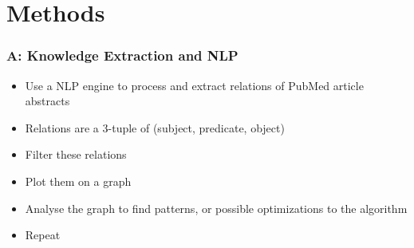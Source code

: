 \documentclass[11pt]{article}
\begin{document}
\section{Methods}

\subsubsection*{A:  Knowledge Extraction and NLP}
\begin{itemize}
\item Use a NLP engine to process and extract relations of PubMed article abstracts
\item Relations are a 3-tuple of (subject, predicate, object)
\item Filter these relations
\item Plot them on a graph
\item Analyse the graph to find patterns, or possible optimizations to the algorithm
\item Repeat
\end{itemize}
\end{document}
